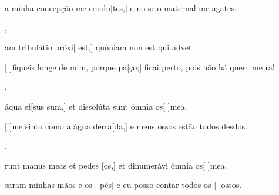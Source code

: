 {    {\item {} a minha concepção me condu[tes,] e no seio maternal me agates.~\Antiphona},
  {\item {}am tribulátio próxi[ est,] quóniam non est qui advet.~\Antiphona}%
    {\item {}[ ]{fi}queis longe de mim, porque pa[ço;] ficai perto, pois não há quem me ra!~\Antiphona},
  {\item {} áqua ef[sus sum,] et dissolúta sunt ómnia os[ ]{me}a.~\Antiphona}%
    {\item {}[ ]{me} sinto como a água derra[da,] e meus ossos estão todos desdos.~\Antiphona},
  {\item {}runt manus meas et pedes [os,] et dinumerávi ómnia os[ ]{me}a.~\Antiphona}%
    {\item {}saram minhas mãos e os [ pés] e eu posso contar todos os [ ]{os}sos.~\Antiphona}
}